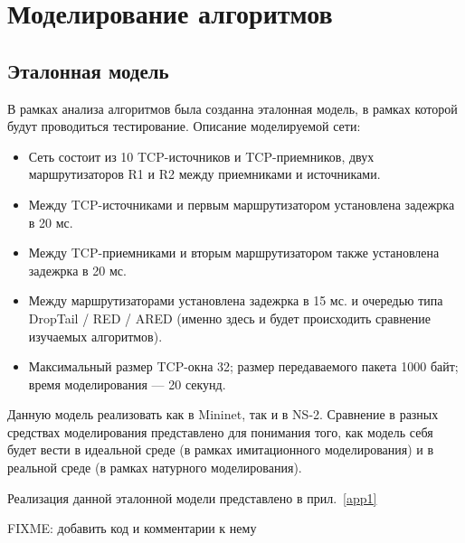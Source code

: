 \chapter{Моделирование алгоритмов}
\label{chap2}

\section{Эталонная модель}
\label{chap2:sec1}

В рамках анализа алгоритмов была созданна эталонная модель, в рамках которой будут проводиться тестирование. Описание моделируемой сети:

\begin{itemize}
        \item Сеть состоит из 10 TCP-источников и TCP-приемников, двух маршрутизаторов R1 и R2 между приемниками и источниками.
        \item Между TCP-источниками и первым маршрутизатором установлена задежрка в 20 мс.
        \item Между TCP-приемниками и вторым маршрутизатором также установлена задежрка в 20 мс.
        \item Между маршрутизаторами установлена задежрка в 15 мс. и очередью
                типа DropTail / RED / ARED (именно здесь и будет происходить
                сравнение изучаемых алгоритмов).
        \item Максимальный размер TCP-окна 32; размер передаваемого пакета 1000 байт; время моделирования --- 20 секунд.
\end{itemize}

Данную модель реализовать как в Mininet, так и в NS-2. Сравнение в разных средствах моделирования представлено для понимания того, как модель себя будет вести в идеальной среде (в рамках имитационного моделирования) и в реальной среде (в рамках натурного моделирования). 

Реализация данной эталонной модели представлено в прил.~\ref{app1}

FIXME: добавить код и комментарии к нему


